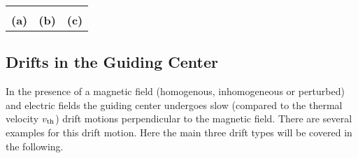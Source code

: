 \begin{center}
    \captionsetup{type=figure}
    \begin{tabular}{c c c}
         &
         &
        \\[0.3cm]
        \textbf{(a)} & \textbf{(b)} & \textbf{(c)} \\
    \end{tabular}
    \label{fig:perp-par-motion}
\end{center}

\newpage

\subsection{Drifts in the Guiding Center}
\label{sub:drift}

In the presence of a magnetic field (homogenous, inhomogeneous or perturbed) and electric fields the guiding center undergoes slow (compared to the thermal velocity $v_\mathrm{th}$) drift motions perpendicular to the magnetic field. There are several examples for this drift motion. Here the main three drift types will be covered in the following. 

